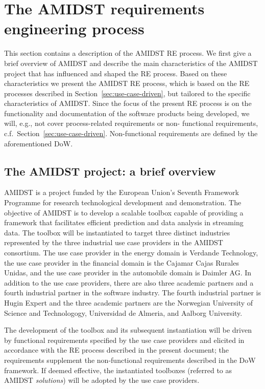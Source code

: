 \section{The AMIDST requirements engineering process}
\label{sec:AmidstRequirementProcess}

This section contains a description of the AMIDST RE process.  We first give a brief overview of AMIDST and describe the 
main characteristics of the AMIDST project that has influenced and shaped the RE process. Based on these characteristics 
we present the AMIDST RE process, which is based on the RE processes described in Section~\ref{sec:use-case-driven}, 
but tailored to the specific characteristics of AMIDST. Since the focus of the present RE process is on the functionality and 
documentation of the software products being developed, we will, e.g., not cover process-related requirements or non-
functional requirements, c.f.\ Section~\ref{sec:use-case-driven}. Non-functional requirements are defined by the
aforementioned DoW. 

\subsection{The AMIDST project: a brief overview}

AMIDST is a project funded by the European Union's Seventh Framework Programme for research technological development
and demonstration. The objective of AMIDST is to develop a scalable toolbox capable of providing a framework that
facilitates efficient prediction and data analysis in streaming data. The toolbox will be instantiated to target three
distinct industries represented by the three industrial use case providers in the AMIDST consortium. The use case
provider in the energy domain is Verdande Technology, the use case provider in the financial domain is the Cajamar Cajas
Rurales Unidas, and the use case provider in the automobile domain is Daimler AG.  In addition to the use case
providers, there are also three academic partners and a fourth industrial partner in the software industry.  The fourth
industrial partner is Hugin Expert and the three academic partners are the Norwegian University of Science and Technologogy, Universidad de Almeria, and Aalborg University.

The development of the toolbox and its subsequent instantiation will be driven by functional requirements specified by the use case providers and elicited in accordance with the RE process described in the present document; the requirements supplement the non-functional requirements described in the DoW framework. If deemed effective, the instantiated toolboxes (referred to as AMIDST \emph{solutions}) will be adopted by the use case providers. 

